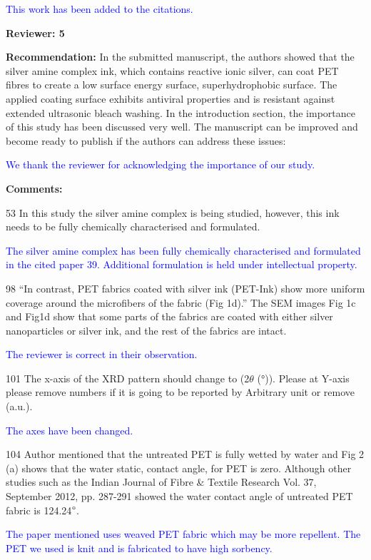 \documentclass[12pt]{letter}
\newcommand{\blue}[1]{\textcolor{blue}{#1}} %
\begin{document}
\blue{This work has been added to the citations. }

\newpage
\textbf{Reviewer: 5}

\textbf{Recommendation:}
In the submitted manuscript, the authors showed that the silver amine complex ink, which contains reactive ionic silver, can coat PET fibres to create a low surface energy surface, superhydrophobic surface. The applied coating surface exhibits antiviral properties and is resistant against extended ultrasonic bleach washing. In the introduction section, the importance of this study has been discussed very well. The manuscript can be improved and become ready to publish if the authors can address these issues:

\blue{We thank the reviewer for acknowledging the importance of our study.}

\textbf{Comments:} 

53 In this study the silver amine complex is being studied, however, this ink needs to be fully chemically characterised and formulated.

\blue{The silver amine complex has been fully chemically characterised and formulated in the cited paper 39.  Additional formulation is held under intellectual property.}

98 “In contrast, PET fabrics coated with silver ink (PET-Ink) show more uniform coverage around the microfibers of the fabric (Fig 1d).”
The SEM images Fig 1c and Fig1d show that some parts of the fabrics are coated with either silver nanoparticles or silver ink, and the rest of the fabrics are intact.

\blue{The reviewer is correct in their observation.}

101 The x-axis of the XRD pattern should change to (2$\theta$ (°)). Please at Y-axis please remove numbers if it is going to be reported by Arbitrary unit or remove (a.u.).

\blue{The axes have been changed. }

104 Author mentioned that the untreated PET is fully wetted by water and Fig 2 (a) shows that the water static, contact angle, for PET is zero. Although other studies such as the Indian Journal of Fibre \& Textile Research Vol. 37, September 2012, pp. 287-291 showed the water contact angle of untreated PET fabric is 124.24$\degree$.

\blue{The paper mentioned uses weaved PET fabric which may be more repellent. The PET we used is knit and is fabricated to have high sorbency. }
\end{document}
